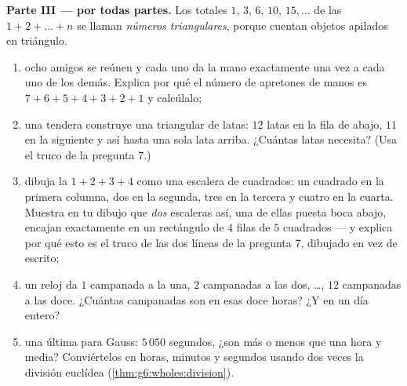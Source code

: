 \begin{problem}
\medskip
\noindent\textbf{Parte III ---  por todas partes.}
Los totales $1$, $3$, $6$, $10$, $15, \dots$ de las 
$1 + 2 + \dots + n$ se llaman \emph{números
triangulares}, porque cuentan objetos
apilados en triángulo.
\begin{enumerate}[resume]
  \item ocho amigos se reúnen y cada uno da la mano exactamente una vez
        a cada uno de los demás. Explica por qué el número de
        apretones de manos es $7 + 6 + 5 + 4 + 3 + 2 + 1$ y calcúlalo;
  \item una tendera construye una  triangular de latas: $12$ latas en
        la fila de abajo, $11$ en la siguiente y así hasta una sola
        lata arriba. ¿Cuántas latas necesita? (Usa el truco de la
        pregunta 7.)
  \item dibuja la  $1 + 2 + 3 + 4$ como una escalera de cuadrados:
        un cuadrado en la primera columna, dos en la segunda, tres
        en la tercera y cuatro en la cuarta. Muestra en tu dibujo
        que \emph{dos} escaleras así, una de ellas puesta boca
        abajo, encajan exactamente en un rectángulo de $4$ filas de
        $5$ cuadrados --- y explica por qué esto es el truco de las dos líneas
        de la pregunta 7, dibujado en vez de escrito;
  \item un reloj da $1$ campanada a la una, $2$ campanadas a las dos,
        \dots, $12$ campanadas a las doce. ¿Cuántas
        campanadas son en esas doce horas? ¿Y en un día entero?
  \item una última para Gauss: $5\,050$ segundos, ¿son más o
        menos que una hora y media? Conviértelos en horas,
        minutos y segundos usando dos veces la división euclídea
        (\cref{thm:g6:wholes:division}).
\end{enumerate}
\end{problem}
